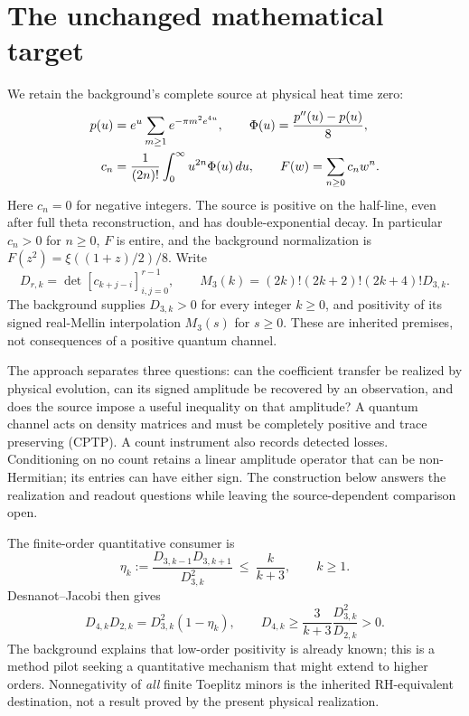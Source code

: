 \documentclass[11pt,letterpaper]{article}
\numberwithin{equation}{section}
\theoremstyle{remark}
\newcommand{\dd}{\,d}
\begin{document}
\section{The unchanged mathematical target}
\label{sec:setup}
We retain the background's complete source at physical heat time zero:
\begin{align}
 p(u)&=e^u\sum_{m\ge1}e^{-\pi m^2e^{4u}},\qquad
 \Phi(u)=\frac{p''(u)-p(u)}8,\notag\\
 c_n&=\frac1{(2n)!}\int_0^\infty u^{2n}\Phi(u)\dd u,
 \qquad F(w)=\sum_{n\ge0}c_nw^n. \label{eq:source}
\end{align}
Here $c_n=0$ for negative integers. The source is positive on the
half-line, even after full theta reconstruction, and has
 double-exponential decay. In particular $c_n>0$ for $n\ge0$, $F$ is
entire, and the background normalization is
$F(z^2)=\xi((1+z)/2)/8$. Write
\begin{equation}
 D_{r,k}=\det[c_{k+j-i}]_{i,j=0}^{r-1},\qquad
 M_3(k)=(2k)!(2k+2)!(2k+4)!D_{3,k}. \label{eq:det}
\end{equation}
The background supplies $D_{3,k}>0$ for every integer $k\ge0$, and
positivity of its signed real-Mellin interpolation $M_3(s)$ for $s\ge0$.
These are inherited premises, not consequences of a positive quantum
channel.

The approach separates three questions: can the coefficient transfer be
realized by physical evolution, can its signed amplitude be recovered by
an observation, and does the source impose a useful inequality on that
amplitude? A quantum channel acts on density matrices and must be
completely positive and trace preserving (CPTP). A count instrument also
records detected losses. Conditioning on no count retains a linear
amplitude operator that can be non-Hermitian; its entries can have either
sign. The construction below answers the realization and readout
questions while leaving the source-dependent comparison open.

The finite-order quantitative consumer is
\begin{equation}
 \eta_k:=\frac{D_{3,k-1}D_{3,k+1}}{D_{3,k}^2}
 \ \le\ \frac{k}{k+3},\qquad k\ge1. \label{eq:target}
\end{equation}
Desnanot--Jacobi then gives
\begin{equation}
 D_{4,k}D_{2,k}=D_{3,k}^2(1-\eta_k),\qquad
 D_{4,k}\ge\frac{3}{k+3}\frac{D_{3,k}^2}{D_{2,k}}>0.
 \label{eq:payoff}
\end{equation}
The background explains that low-order positivity is already known;
this is a method pilot seeking a quantitative mechanism that might
extend to higher orders. Nonnegativity of \emph{all} finite Toeplitz
minors is the inherited RH-equivalent destination, not a result proved
by the present physical realization.
\end{document}
